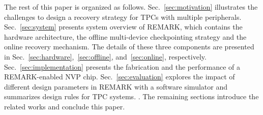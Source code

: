 The rest of this paper is organized as follows.
Sec.~\ref{sec:motivation} illustrates the challenges to design a recovery strategy for TPCs with multiple peripherals.
Sec.~\ref{sec:system} presents system overview of REMARK, which contains the hardware architecture, the offline multi-device checkpointing strategy and the online recovery mechanism.
The details of these three components are presented in Sec.~\ref{sec:hardware},~\ref{sec:offline}, and~\ref{sec:online}, respectively. 
Sec.~\ref{sec:implementation} presents the fabrication and the performance of a REMARK-enabled NVP chip.
Sec.~\ref{sec:evaluation} explores the impact of different design parameters in REMARK with a software simulator and summarizes design rules for TPC systems. .
The remaining sections introduce the related works and conclude this paper.
